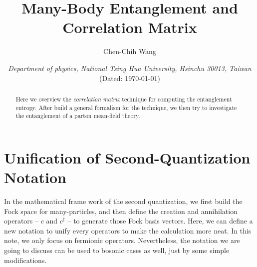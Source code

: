 \documentclass[12font]{article}
\title{\textbf{ Many-Body Entanglement and Correlation Matrix}}
\author{Chen-Chih Wang  }
\date{\textit{Department of physics, National Tsing Hua University, Hsinchu 30013, Taiwan} \\ (Dated: \today)}
\theoremstyle{definition}
\numberwithin{equation}{section}
\begin{document}
\maketitle
\begin{abstract}
  Here we overview the \emph{correlation matrix} technique for computing the entanglement entropy. After build a general formalism for the technique, we then try to investigate the entanglement of a parton mean-field theory.
\end{abstract}

\tableofcontents

\section{Unification of Second-Quantization Notation}
In the mathematical frame work of the second quantization, we first build the Fock space for many-particles, and then define the creation and annihilation operators -- $c$ and $c^\dagger$ -- to generate those Fock basis vectors. Here, we can define a new notation to unify every operators to make the calculation more neat. In this note, we only focus on fermionic operators. Nevertheless, the notation we are going to discuss can be used to bosonic cases as well, just by some simple modifications.
\end{document}
